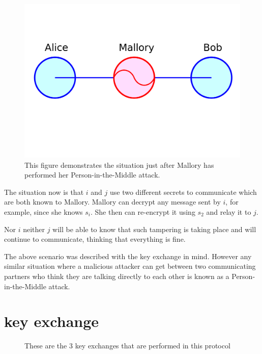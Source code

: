 \begin{figure}[h]
\includegraphics[scale=0.4]{Figures/Person_in_the_middle_attack.jpg}
\caption[A Person-in-the-Middle attack]{This figure demonstrates the situation just after Mallory has performed her Person-in-the-Middle attack.}
\end{figure}

The situation now is that $i$ and $j$ use two different secrets to communicate which are both known to Mallory.
Mallory can decrypt any message sent by $i$, for example, since she knows $s_i$.
She then can re-encrypt it using $s_2$ and relay it to $j$.

Nor $i$ neither $j$ will be able to know that such tampering is taking place and will continue to communicate, thinking that everything is fine.

The above scenario was described with the \dhname key exchange in mind.
However any similar situation where a malicious attacker can get between two communicating partners who think they are talking directly to each other is known as a Person-in-the-Middle attack.

\section{\tdhname key exchange}
\begin{figure}[h]
\begin{centering}
  
  \caption[\tdhname in a picture]{These are the 3 \dhname key exchanges that are performed in this protocol}
\end{centering}
\end{figure}

